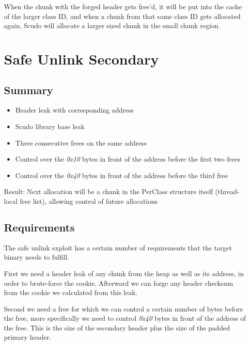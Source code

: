 \documentclass[a4paper,11pt,oneside]{report}
\begin{document}
When the chunk with the forged header gets free'd, it will be put into the cache of the
larger class ID, and when a chunk from that same class ID gets allocated again, Scudo will
allocate a larger sized chunk in the small chunk region.


\section{Safe Unlink Secondary}


\subsection{Summary}

\begin{itemize}
\item Header leak with corresponding address
\item Scudo library base leak
\item Three consecutive frees on the same address
\item Control over the \emph{0x10} bytes in front of the address before the first two
  frees
\item Control over the \emph{0x40} bytes in front of the address before the third free
\end{itemize}

Result: Next allocation will be a chunk in the PerClass structure itself (thread-local
free list), allowing control of future allocations


\subsection{Requirements}

The safe unlink exploit has a certain number of requirements that the target binary needs
to fulfill.

First we need a header leak of any chunk from the heap as well as its address, in
order to brute-force the cookie. Afterward we can forge any header checksum from the
cookie we calculated from this leak.

Second we need a free for which we can control a certain number of bytes before the free,
more specifically we need to control \emph{0x40} bytes in front of the address of the
free. This is the size of the secondary header plus the size of the padded primary header.
\end{document}
